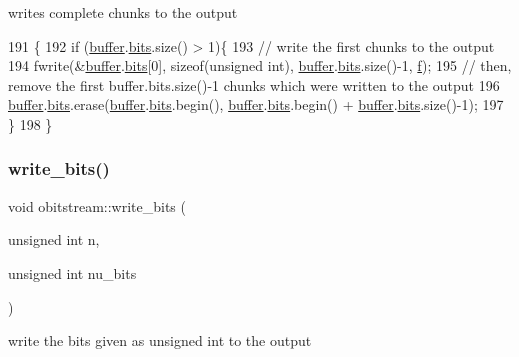 writes complete chunks to the output 


\begin{DoxyCode}
191                       \{
192   \textcolor{keywordflow}{if} (\hyperlink{classobitstream_aeaccad00a395a404aa16472bfa052be3}{buffer}.\hyperlink{classbit__pipe_a86f38af1e9736b053728033490476b50}{bits}.size() > 1)\{
193     \textcolor{comment}{// write the first chunks to the output}
194     fwrite(&\hyperlink{classobitstream_aeaccad00a395a404aa16472bfa052be3}{buffer}.\hyperlink{classbit__pipe_a86f38af1e9736b053728033490476b50}{bits}[0], \textcolor{keyword}{sizeof}(\textcolor{keywordtype}{unsigned} \textcolor{keywordtype}{int}), \hyperlink{classobitstream_aeaccad00a395a404aa16472bfa052be3}{buffer}.\hyperlink{classbit__pipe_a86f38af1e9736b053728033490476b50}{bits}.size()-1, 
      \hyperlink{classobitstream_ac589d74745217748c888ae777ab324a7}{f});
195     \textcolor{comment}{// then, remove the first buffer.bits.size()-1 chunks which were written to the output}
196     \hyperlink{classobitstream_aeaccad00a395a404aa16472bfa052be3}{buffer}.\hyperlink{classbit__pipe_a86f38af1e9736b053728033490476b50}{bits}.erase(\hyperlink{classobitstream_aeaccad00a395a404aa16472bfa052be3}{buffer}.\hyperlink{classbit__pipe_a86f38af1e9736b053728033490476b50}{bits}.begin(), \hyperlink{classobitstream_aeaccad00a395a404aa16472bfa052be3}{buffer}.\hyperlink{classbit__pipe_a86f38af1e9736b053728033490476b50}{bits}.begin() + 
      \hyperlink{classobitstream_aeaccad00a395a404aa16472bfa052be3}{buffer}.\hyperlink{classbit__pipe_a86f38af1e9736b053728033490476b50}{bits}.size()-1); 
197   \}
198 \}
\end{DoxyCode}
\mbox{\label{classobitstream_afb0cc2fb4f739881436d887bd4770355}} 
\subsubsection{\texorpdfstring{write\+\_\+bits()}{write\_bits()}}
{\footnotesize\ttfamily void obitstream\+::write\+\_\+bits (\begin{DoxyParamCaption}\item[{unsigned int}]{n,  }\item[{unsigned int}]{nu\+\_\+bits }\end{DoxyParamCaption})}



write the bits given as unsigned int to the output 


